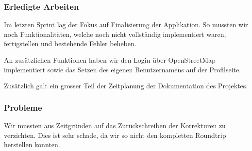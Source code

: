 \subsubsection{Erledigte Arbeiten}

Im letzten Sprint lag der Fokus auf Finalisierung der Applikation.
So mussten wir noch Funktionalitäten, welche noch nicht vollständig implementiert waren, fertigstellen und bestehende Fehler beheben.

An zusätzlichen Funktionen haben wir den Login über OpenStreetMap implementiert sowie das Setzen des eigenen Benutzernamens auf der Profilseite.

Zusätzlich galt ein grosser Teil der Zeitplanung der Dokumentation des Projektes.

\subsubsection{Probleme}
Wir mussten aus Zeitgründen auf das Zurückschreiben der Korrekturen zu  verzichten.
Dies ist sehr schade, da wir so nicht den kompletten Roundtrip herstellen konnten.